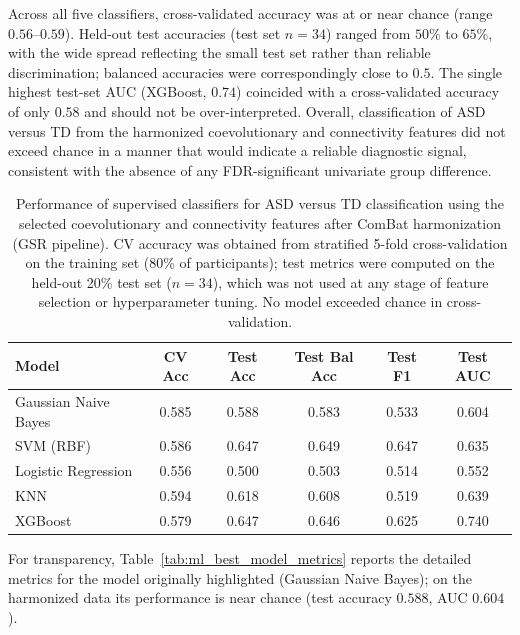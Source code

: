 \documentclass[10pt,letterpaper]{article}
\begin{document}
Across all five classifiers, cross-validated accuracy was at or near chance (range $0.56$--$0.59$).
Held-out test accuracies (test set $n = 34$) ranged from $50\%$ to $65\%$, with the wide spread
reflecting the small test set rather than reliable discrimination; balanced accuracies were
correspondingly close to $0.5$. The single highest test-set AUC (XGBoost, $0.74$) coincided with a
cross-validated accuracy of only $0.58$ and should not be over-interpreted. Overall, classification
of ASD versus TD from the harmonized coevolutionary and connectivity features did not exceed chance
in a manner that would indicate a reliable diagnostic signal, consistent with the absence of any
FDR-significant univariate group difference.

\begin{table}[ht]
\centering
\caption{Performance of supervised classifiers for ASD versus TD classification using the selected
coevolutionary and connectivity features after ComBat harmonization (GSR pipeline). CV accuracy was
obtained from stratified 5-fold cross-validation on the training set (80\% of participants); test
metrics were computed on the held-out 20\% test set ($n = 34$), which was not used at any stage of
feature selection or hyperparameter tuning. No model exceeded chance in cross-validation.}
\label{tab:ml_summary_full}
\setlength{\tabcolsep}{4pt}
\small
\begin{tabular}{lccccc}
\toprule
Model & CV Acc & Test Acc & Test Bal Acc & Test F1 & Test AUC \\
\midrule
Gaussian Naive Bayes  & 0.585 & 0.588 & 0.583 & 0.533 & 0.604 \\
SVM (RBF)             & 0.586 & 0.647 & 0.649 & 0.647 & 0.635 \\
Logistic Regression   & 0.556 & 0.500 & 0.503 & 0.514 & 0.552 \\
KNN                   & 0.594 & 0.618 & 0.608 & 0.519 & 0.639 \\
XGBoost               & 0.579 & 0.647 & 0.646 & 0.625 & 0.740 \\
\bottomrule
\end{tabular}
\end{table}

For transparency, Table~\ref{tab:ml_best_model_metrics} reports the detailed metrics for the model
originally highlighted (Gaussian Naive Bayes); on the harmonized data its performance is near chance
(test accuracy $0.588$, AUC $0.604$).
\end{document}
